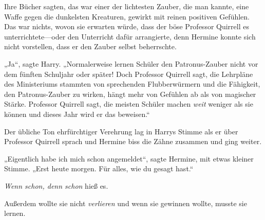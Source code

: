 Ihre Bücher sagten, das war einer der lichtesten Zauber, die man kannte, eine Waffe gegen die dunkelsten Kreaturen, gewirkt mit reinen positiven Gefühlen. Das war nichts, wovon sie erwarten würde, dass der böse Professor Quirrell es unterrichtete—oder den Unterricht dafür arrangierte, denn Hermine konnte sich nicht vorstellen, dass er den Zauber selbst beherrschte.

„Ja“, sagte Harry. „Normalerweise lernen Schüler den Patronus-Zauber nicht vor dem fünften Schuljahr oder später! Doch Professor Quirrell sagt, die Lehrpläne des Ministeriums stammten von sprechenden Flubberwürmern und die Fähigkeit, den Patronus-Zauber zu wirken, hängt mehr von Gefühlen ab als von magischer Stärke. Professor Quirrell sagt, die meisten Schüler machen \emph{weit} weniger als sie können und dieses Jahr wird er das beweisen.“

Der übliche Ton ehrfürchtiger Verehrung lag in Harrys Stimme als er über Professor Quirrell sprach und Hermine biss die Zähne zusammen und ging weiter.

„Eigentlich habe ich mich schon angemeldet“, sagte Hermine, mit etwas kleiner Stimme. „Erst heute morgen. Für alles, wie du gesagt hast.“

\emph{Wenn schon, denn schon} hieß es.

Außerdem wollte sie nicht \emph{verlieren} und wenn sie gewinnen wollte, musste sie lernen.

